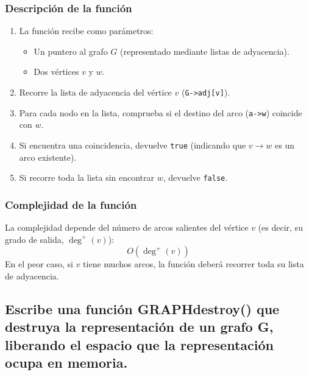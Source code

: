 \documentclass{article}
\begin{document}
        \subsubsection*{Descripción de la función}
            \begin{enumerate}
                \item La función recibe como parámetros:
                \begin{itemize}
                    \item Un puntero al grafo \( G \) (representado mediante listas de adyacencia).
                    \item Dos vértices \( v \) y \( w \).
                \end{itemize}
                \item Recorre la lista de adyacencia del vértice \( v \) (\texttt{G->adj[v]}).
                \item Para cada nodo en la lista, comprueba si el destino del arco (\texttt{a->w}) coincide con \( w \).
                \item Si encuentra una coincidencia, devuelve \texttt{true} (indicando que \( v \to w \) es un arco existente).
                \item Si recorre toda la lista sin encontrar \( w \), devuelve \texttt{false}.
            \end{enumerate}
            
        \subsubsection*{Complejidad de la función}
            La complejidad depende del número de arcos salientes del vértice \( v \) (es decir, su grado de salida, \( \deg^+(v) \)):
            \[
            O(\deg^+(v))
            \]
            En el peor caso, si \( v \) tiene muchos arcos, la función deberá recorrer toda su lista de adyacencia.
       

    \subsection{Escribe una función GRAPHdestroy() que destruya la representación de un grafo G, liberando el espacio que la representación ocupa en memoria.}

        
\end{document}
